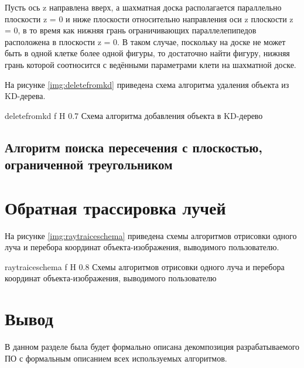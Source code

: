 Пусть ось z направлена вверх, а шахматная доска располагается параллельно плоскости z = 0 и ниже плоскости относительно направления оси z плоскости z = 0, в то время как нижняя грань ограничивающих параллелепипедов расположена в плоскости z = 0. 
В таком случае, поскольку на доске не может быть в одной клетке более одной фигуры, то достаточно найти фигуру, нижняя грань которой соотносится с ведёнными параметрами клети на шахматной доске.

На рисунке \ref{img:deletefromkd} приведена схема алгоритма удаления объекта из KD-дерева.

{deletefromkd}
{f}
{H}
{0.7\textwidth}
{Схема алгоритма добавления объекта в KD-дерево}
 
\subsection{Алгоритм поиска пересечения с плоскостью, ограниченной треугольником}

\section{Обратная трассировка лучей}

На рисунке \ref{img:raytraiceschema} приведена схемы алгоритмов отрисовки одного луча и перебора координат объекта-изображения, выводимого пользователю.

{raytraiceschema}
{f}
{H}
{0.8\textwidth}
{Схемы алгоритмов отрисовки одного луча и перебора координат объекта-изображения, выводимого пользователю}

\section*{Вывод}

В данном разделе была будет формально описана декомпозиция разрабатываемого ПО с формальным описанием всех используемых алгоритмов.

